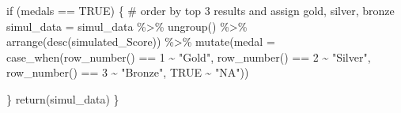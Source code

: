 \documentclass[
  letterpaper,
  DIV=11,
  numbers=noendperiod]{scrartcl}
\newenvironment{Shaded}{\begin{snugshade}}{\end{snugshade}}
\newcommand{\AttributeTok}[1]{\textcolor[rgb]{0.40,0.45,0.13}{#1}}
\newcommand{\CommentTok}[1]{\textcolor[rgb]{0.37,0.37,0.37}{#1}}
\newcommand{\ConstantTok}[1]{\textcolor[rgb]{0.56,0.35,0.01}{#1}}
\newcommand{\ControlFlowTok}[1]{\textcolor[rgb]{0.00,0.23,0.31}{#1}}
\newcommand{\DecValTok}[1]{\textcolor[rgb]{0.68,0.00,0.00}{#1}}
\newcommand{\FunctionTok}[1]{\textcolor[rgb]{0.28,0.35,0.67}{#1}}
\newcommand{\NormalTok}[1]{\textcolor[rgb]{0.00,0.23,0.31}{#1}}
\newcommand{\OtherTok}[1]{\textcolor[rgb]{0.00,0.23,0.31}{#1}}
\newcommand{\SpecialCharTok}[1]{\textcolor[rgb]{0.37,0.37,0.37}{#1}}
\newcommand{\StringTok}[1]{\textcolor[rgb]{0.13,0.47,0.30}{#1}}
\begin{document}
\begin{Shaded}
\begin{Highlighting}[]
  \ControlFlowTok{if}\NormalTok{ (medals }\SpecialCharTok{==} \ConstantTok{TRUE}\NormalTok{) \{}
    \CommentTok{\# order by top 3 results and assign gold, silver, bronze}
\NormalTok{    simul\_data }\OtherTok{=}\NormalTok{ simul\_data }\SpecialCharTok{\%\textgreater{}\%}
      \FunctionTok{ungroup}\NormalTok{() }\SpecialCharTok{\%\textgreater{}\%}
      \FunctionTok{arrange}\NormalTok{(}\FunctionTok{desc}\NormalTok{(simulated\_Score)) }\SpecialCharTok{\%\textgreater{}\%}
      \FunctionTok{mutate}\NormalTok{(}\AttributeTok{medal =} \FunctionTok{case\_when}\NormalTok{(}\FunctionTok{row\_number}\NormalTok{() }\SpecialCharTok{==} \DecValTok{1} \SpecialCharTok{\textasciitilde{}} \StringTok{"Gold"}\NormalTok{,}
                               \FunctionTok{row\_number}\NormalTok{() }\SpecialCharTok{==} \DecValTok{2} \SpecialCharTok{\textasciitilde{}} \StringTok{"Silver"}\NormalTok{,}
                               \FunctionTok{row\_number}\NormalTok{() }\SpecialCharTok{==} \DecValTok{3} \SpecialCharTok{\textasciitilde{}} \StringTok{"Bronze"}\NormalTok{,}
                               \ConstantTok{TRUE} \SpecialCharTok{\textasciitilde{}} \StringTok{"NA"}\NormalTok{))}
    
\NormalTok{  \}}
  \FunctionTok{return}\NormalTok{(simul\_data)}
\NormalTok{\}}
\end{Highlighting}
\end{Shaded}
\end{document}
